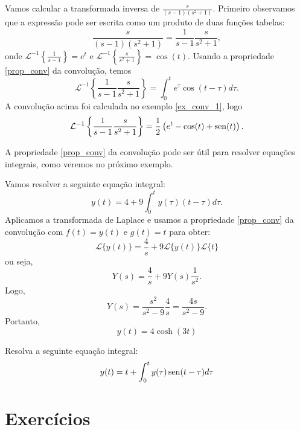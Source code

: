\begin{ex}Vamos calcular a transformada inversa de $\frac{s}{(s-1)(s^2+1)}$. Primeiro observamos que a expressão pode ser escrita como um produto de duas funções tabelas:
$$
\frac{s}{(s-1)(s^2+1)}=\frac{1}{s-1}\frac{s}{s^2+1},
$$
 onde $\mathcal{L}^{-1}\left\{\frac{1}{s-1}\right\}=e^t$ e $\mathcal{L}^{-1}\left\{\frac{s}{s^2+1}\right\}=\cos(t)$. Usando a propriedade \ref{prop_conv} da convolução, temos
 $$
 \mathcal{L}^{-1}\left\{\frac{1}{s-1}\frac{s}{s^2+1}\right\}=\int_0^t e^\tau \cos(t-\tau)d\tau.
 $$
 A convolução acima foi calculada no exemplo \ref{ex_conv_1}, logo
$$
 \mathcal{L}^{-1}\left\{\frac{1}{s-1}\frac{s}{s^2+1}\right\}= \frac{1}{2}\left(e^t-\cos(t)+\operatorname{sen}(t)  \right).
 $$
 \end{ex}
 A propriedade \ref{prop_conv} da convolução pode ser útil para resolver equações integrais, como veremos no próximo exemplo.
 \begin{ex} Vamos resolver a seguinte equação integral:
 $$
 y(t)=4+9\int_0^t y(\tau)(t-\tau)d\tau.
 $$
 Aplicamos a transformada de Laplace e usamos a propriedade \ref{prop_conv} da convolução com $f(t)=y(t)$ e $g(t)=t$ para obter:
 $$
 \mathcal{L}\{y(t)\}=\frac{4}{s}+9\mathcal{L}\{y(t)\}\mathcal{L}\{t\}
 $$
 ou seja,
 $$
 Y(s)=\frac{4}{s}+9Y(s)\frac{1}{s^2}.
 $$
 Logo,
 $$
 Y(s)=\frac{s^2}{s^2-9}\frac{4}{s}=\frac{4s}{s^2-9}.
 $$
 Portanto,
 $$
 y(t)=4\cosh(3t)
 $$
 
\end{ex}
\begin{prob}Resolva a seguinte equação integral:
$$
y(t)=t+\int_0^t y(\tau)\operatorname{sen}(t-\tau)d\tau
$$
 
\end{prob}

\section{Exercícios}



